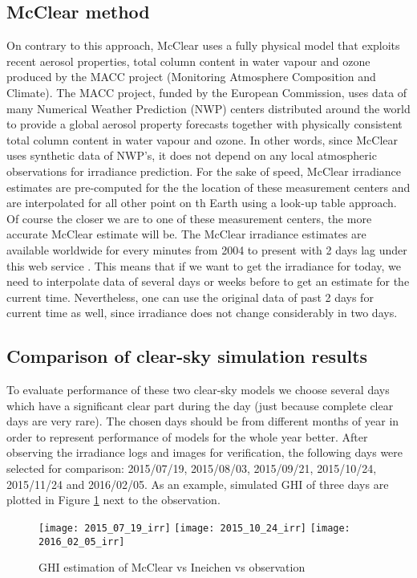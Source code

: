 \subsection{McClear method}
On contrary to this approach, McClear uses a fully physical model that exploits recent aerosol properties, total column content in water vapour and ozone produced by the MACC project (Monitoring Atmosphere Composition and Climate). The MACC project, funded by the European Commission, uses  data of many Numerical Weather Prediction (NWP) centers distributed around the world to provide a global aerosol property forecasts together with physically consistent total column content in water vapour and ozone. In other words, since McClear uses synthetic data of NWP's, it does not depend on any local atmospheric observations for irradiance prediction. For the sake of speed, McClear irradiance estimates are pre-computed for the the location of these measurement centers and are interpolated for all other point on th Earth using a look-up table approach. Of course the closer we are to one of these measurement centers, the more accurate McClear estimate will be. The McClear irradiance estimates are available worldwide for every minutes from 2004 to present with 2 days lag under this web service \cite{mcclear_site}. This means that if we want to get the irradiance for today, we need to interpolate data of several days or weeks before to get an estimate for the current time. Nevertheless, one can use the original data of past 2 days for current time as well, since irradiance does not change considerably in two days.

\subsection{Comparison of clear-sky simulation results}
\label{sec:compare-clear-sky-result}
To evaluate performance of these two clear-sky models we choose several days which have a significant clear part during the day (just because complete clear days are very rare). The chosen days should be from different months of year in order to represent performance of models for the whole year better. After observing the irradiance logs and images for verification, the following days were selected for comparison: 2015/07/19, 2015/08/03, 2015/09/21, 2015/10/24, 2015/11/24 and 2016/02/05. As an example, simulated GHI of three days are plotted in Figure \ref{fig:mcclear_vs_Ineichen_days} next to the observation. 

\begin{figure}[!ht]
\caption{GHI estimation of McClear vs Ineichen vs observation}
\label{fig:mcclear_vs_Ineichen_days}
\texttt{[image: 2015\_07\_19\_irr]}
\texttt{[image: 2015\_10\_24\_irr]}
\texttt{[image: 2016\_02\_05\_irr]}
\centering
\end{figure}

